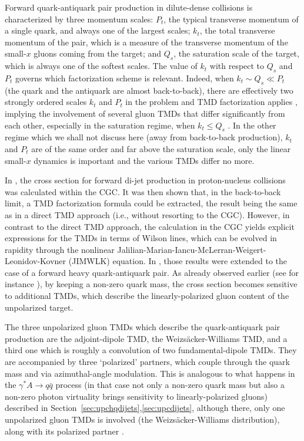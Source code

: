 \documentclass[../report.tex]{subfiles}
\begin{document}
Forward quark-antiquark pair production in dilute-dense collisions is characterized by three momentum scales: $P_{t}$, the typical transverse
momentum of a single quark, and always one of the largest scales; $k_{t}$, the total transverse momentum of the pair, which is a measure of the transverse momentum of the small-$x$ gluons coming from the target; and $Q_s$, the saturation scale of the target, which is always one of the softest scales.
The value of $k_{t}$ with respect to $Q_{s}$ and $P_{t}$ governs which factorization scheme is relevant. Indeed, when $k_{t}\sim Q_{s}\ll P_{t}$ (the quark and the antiquark are almost back-to-back), there are effectively two strongly ordered scales $k_{t}$ and $P_{t}$ in the problem and TMD factorization applies \cite{Dominguez:2011wm}, implying the involvement of several gluon TMDs that differ significantly from each other, especially in the saturation regime, when $k_t\leq Q_s$ \cite{Marquet:2016cgx}. In the other regime which we shall not discuss here (away from back-to-back production), $k_{t}$ and $P_{t}$ are of the same order and far above the saturation scale, only the linear small-$x$ dynamics is important and the various TMDs differ no more.

In \cite{Marquet:2007vb,Dominguez:2011wm}, the cross section for forward di-jet production in proton-nucleus collisions
was calculated within the CGC. It was then shown that, in the back-to-back limit, a TMD factorization formula could
be extracted, the result being the same as in a direct TMD approach (i.e., without resorting to the CGC). However, in contrast to the
direct TMD approach, the calculation in the CGC yields explicit expressions for the TMDs in terms of Wilson lines, which can be evolved in rapidity
through the nonlinear Jalilian-Marian-Iancu-McLerran-Weigert-Leonidov-Kovner (JIMWLK) equation. In \cite{Marquet:2017xwy}, those results
were extended to the case of a forward heavy quark-antiquark pair. As already observed earlier (see for instance \cite{Mulders:2000sh,Boer:2009nc,Boer:2010zf,Metz:2011wb,dominguez:2011br,Akcakaya:2012si}), by keeping a non-zero quark mass, the cross section becomes sensitive to additional TMDs, which describe the linearly-polarized gluon content of the unpolarized target.

The three unpolarized gluon TMDs which describe the quark-antiquark pair production are the adjoint-dipole TMD, the Weizs{\"a}cker-Williams TMD, and a third one which is roughly a convolution of two fundamental-dipole TMDs. They are accompanied by three \textquoteleft polarized' partners, which couple through the quark mass and via azimuthal-angle modulation. This is analogous to what happens in the $\gamma^*A\rightarrow q\bar{q}$ process (in that case not only a non-zero quark mass but also a non-zero photon virtuality brings sensitivity to linearly-polarized gluons) described in Section~\ref{sec:upchqdijets},\ref{sec:upcdijets}, although there, only one unpolarized gluon TMDs is involved (the Weizs{\"a}cker-Williams distribution), along with its polarized partner \cite{Metz:2011wb,dominguez:2011br}. %
\end{document}

